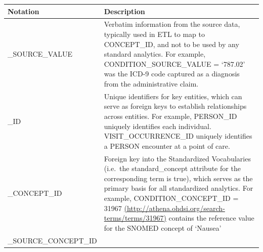 \documentclass[]{book}
\begin{document}
\begin{longtable}[]{@{}ll@{}}
\toprule
\begin{minipage}[b]{0.24\columnwidth}\raggedright
Notation\strut
\end{minipage} & \begin{minipage}[b]{0.71\columnwidth}\raggedright
Description\strut
\end{minipage}\tabularnewline
\midrule
\endhead
\begin{minipage}[t]{0.24\columnwidth}\raggedright
\_SOURCE\_VALUE\strut
\end{minipage} & \begin{minipage}[t]{0.71\columnwidth}\raggedright
Verbatim information from the source data, typically used in ETL to map to CONCEPT\_ID, and not to be used by any standard analytics. For example, CONDITION\_SOURCE\_VALUE = `787.02' was the ICD-9 code captured as a diagnosis from the administrative claim.\strut
\end{minipage}\tabularnewline
\begin{minipage}[t]{0.24\columnwidth}\raggedright
\_ID\strut
\end{minipage} & \begin{minipage}[t]{0.71\columnwidth}\raggedright
Unique identifiers for key entities, which can serve as foreign keys to establish relationships across entities. For example, PERSON\_ID uniquely identifies each individual. VISIT\_OCCURRENCE\_ID uniquely identifies a PERSON encounter at a point of care.\strut
\end{minipage}\tabularnewline
\begin{minipage}[t]{0.24\columnwidth}\raggedright
\_CONCEPT\_ID\strut
\end{minipage} & \begin{minipage}[t]{0.71\columnwidth}\raggedright
Foreign key into the Standardized Vocabularies (i.e.~the standard\_concept attribute for the corresponding term is true), which serves as the primary basis for all standardized analytics. For example, CONDITION\_CONCEPT\_ID = 31967 \href{http://athena.ohdsi.org/search-terms/terms/31967}{(http://athena.ohdsi.org/search-terms/terms/31967)} contains the reference value for the SNOMED concept of `Nausea'\strut
\end{minipage}\tabularnewline
\begin{minipage}[t]{0.24\columnwidth}\raggedright
\_SOURCE\_CONCEPT\_ID\strut
\end{minipage} & \begin{minipage}[t]{0.71\columnwidth}\raggedright

\end{minipage}
\end{longtable}
\end{document}
